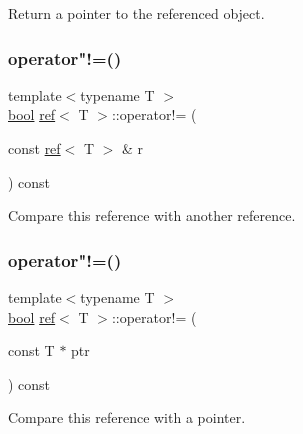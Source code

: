 Return a pointer to the referenced object. 

\mbox{\label{classref_ae4fb583b5cdbd8659c8dfc91ca5ba4f2}} 
\subsubsection{\texorpdfstring{operator"!=()}{operator!=()}\hspace{0.1cm}{\footnotesize\ttfamily [1/2]}}
{\footnotesize\ttfamily template$<$typename T $>$ \\
\mbox{\hyperlink{asdl_8h_af6a258d8f3ee5206d682d799316314b1}{bool}} \mbox{\hyperlink{classref}{ref}}$<$ T $>$\+::operator!= (\begin{DoxyParamCaption}\item[{const \mbox{\hyperlink{classref}{ref}}$<$ T $>$ \&}]{r }\end{DoxyParamCaption}) const\hspace{0.3cm}{\ttfamily [inline]}}



Compare this reference with another reference. 

\mbox{\label{classref_a932a54e9c0e107e7edf78d550ef4852f}} 
\subsubsection{\texorpdfstring{operator"!=()}{operator!=()}\hspace{0.1cm}{\footnotesize\ttfamily [2/2]}}
{\footnotesize\ttfamily template$<$typename T $>$ \\
\mbox{\hyperlink{asdl_8h_af6a258d8f3ee5206d682d799316314b1}{bool}} \mbox{\hyperlink{classref}{ref}}$<$ T $>$\+::operator!= (\begin{DoxyParamCaption}\item[{const T $\ast$}]{ptr }\end{DoxyParamCaption}) const\hspace{0.3cm}{\ttfamily [inline]}}



Compare this reference with a pointer. 

\mbox{\label{classref_acc07281f5c8afd7660e0965da19a2c0c}} 
